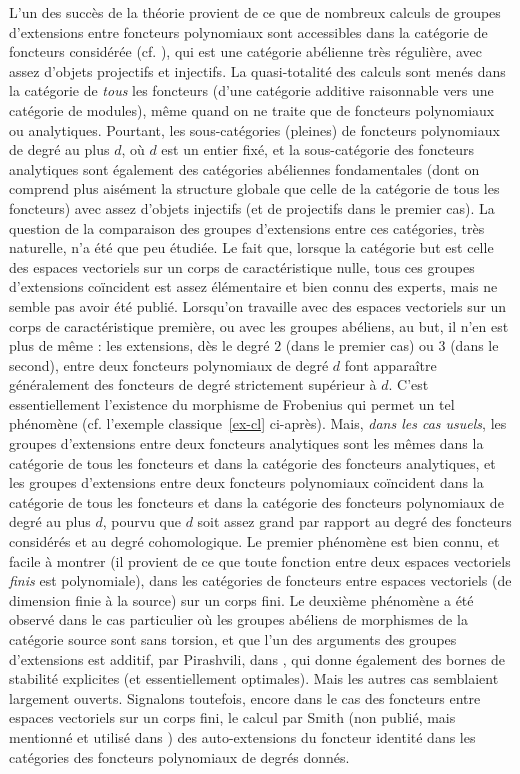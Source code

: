 \documentclass[a4paper,10pt]{article}
\theoremstyle{definition}
\theoremstyle{remark}
\begin{document}
L'un des succès de la théorie provient de ce que de nombreux calculs de groupes d'extensions entre foncteurs polynomiaux sont accessibles dans la catégorie de foncteurs considérée (cf. \cite{FFSS}), qui est une catégorie abélienne très régulière, avec assez d'objets projectifs et injectifs. La quasi-totalité des calculs sont menés dans la catégorie de {\em tous} les foncteurs (d'une catégorie additive raisonnable vers une catégorie de modules), même quand on ne traite que de foncteurs polynomiaux ou analytiques. Pourtant, les sous-catégories (pleines) de foncteurs polynomiaux de degré au plus $d$, où $d$ est un entier fixé, et la sous-catégorie des foncteurs analytiques sont également des catégories abéliennes fondamentales (dont on comprend plus aisément la structure globale que celle de la catégorie de tous les foncteurs) avec assez d'objets injectifs (et de projectifs dans le premier cas). La question de la comparaison des groupes d'extensions entre ces catégories, très naturelle, n'a été que peu étudiée. Le fait que, lorsque la catégorie but est celle des espaces vectoriels sur un corps de caractéristique nulle, tous ces groupes d'extensions coïncident est assez élémentaire et bien connu des experts, mais ne semble pas avoir été publié. Lorsqu'on travaille avec des espaces vectoriels sur un corps de caractéristique première, ou avec les groupes abéliens, au but, il n'en est plus de même : les extensions, dès le degré $2$ (dans le premier cas) ou $3$ (dans le second), entre deux foncteurs polynomiaux de degré $d$ font apparaître généralement des foncteurs de degré strictement supérieur à $d$. C'est essentiellement l'existence du morphisme de Frobenius qui permet un tel phénomène (cf. l'exemple classique~\ref{ex-cl} ci-après). Mais, {\em dans les cas usuels}, les groupes d'extensions entre deux foncteurs analytiques sont les mêmes dans la catégorie de tous les foncteurs et dans la catégorie des foncteurs analytiques, et les groupes d'extensions entre deux foncteurs polynomiaux coïncident dans la catégorie de tous les foncteurs et dans la catégorie des foncteurs polynomiaux de degré au plus $d$, pourvu que $d$ soit assez grand par rapport au degré des foncteurs considérés et au degré cohomologique. Le premier phénomène est bien connu, et facile à montrer (il provient de ce que toute fonction entre deux espaces vectoriels {\em finis} est polynomiale), dans les catégories de foncteurs entre espaces vectoriels (de dimension finie à la source) sur un corps fini. Le deuxième phénomène a été observé dans le cas particulier où les groupes abéliens de morphismes de la catégorie source sont sans torsion, et que l'un des arguments des groupes d'extensions est additif, par Pirashvili, dans \cite{P-extor}, qui donne également des bornes de stabilité explicites (et essentiellement optimales). Mais les autres cas semblaient largement ouverts. Signalons toutefois, encore dans le cas des foncteurs entre espaces vectoriels sur un corps fini, le calcul par Smith (non publié, mais mentionné et utilisé dans \cite{FrS}) des auto-extensions du foncteur identité dans les catégories des foncteurs polynomiaux de degrés donnés.
\end{document}
